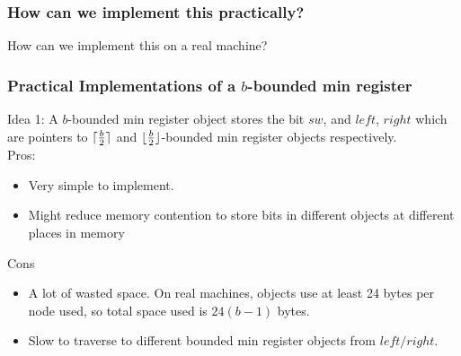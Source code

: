 \documentclass{beamer}
\DeclarePairedDelimiter\ceil{\lceil}{\rceil}
\DeclarePairedDelimiter\floor{\lfloor}{\rfloor}
\begin{document}
\begin{comment}
		\draw [thick ,decorate,decoration={brace,amplitude=5pt}] (3.6,-2.8)  -- +(3.3,0) 
		node [black,midway,above=4pt, font=\scriptsize] {$D$};
		\draw [thick ,decorate,decoration={brace,amplitude=5pt}] (0.1,-2.8)  -- +(3.3,0) 
		node [black,midway,above=4pt, font=\scriptsize] {$A$};

		\node(C) at (3.58,-3.0){};
		\node[text width=3.5cm](D) at (1.3,-4.2){$B$ instances linearized here, in order};
		\draw[edge] (D) -- (C);
		\node(E) at (3.42,-3.0){};
		\node[text width=3.5cm](F) at (5.8,-4.2){$C$ instances linearized here, in order};
		\draw[edge] (F) -- (E);
		\end{tikzpicture}
	\end{figure}
\end{frame}
\end{comment}
\begin{frame}
	\frametitle{How can we implement this practically?}
	How can we implement this on a real machine?
\end{frame}
\begin{frame}
\frametitle{Practical Implementations of a $b$-bounded min register}
Idea 1: A $b$-bounded min register object stores the bit $sw$, 
and $left$, $right$ which are pointers to $\ceil{\frac{b}{2}}$ and $\floor{\frac{b}{2}}$-bounded min register objects respectively.
\\
Pros:
\begin{itemize}
	\item Very simple to implement.
	\item Might reduce memory contention to store bits in different objects at different places in memory
\end{itemize}
Cons
\begin{itemize}
	\item A lot of wasted space. On real machines, objects use at least 24 bytes per node used, so total space used is $24(b-1)$ bytes.
	\item Slow to traverse to different bounded min register objects from $left/right$.
\end{itemize}
\end{frame}
\end{document}
